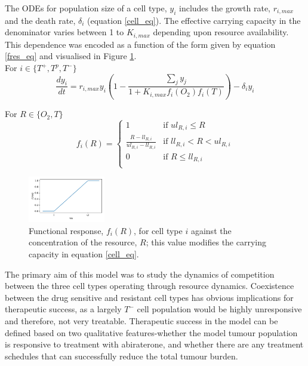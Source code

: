 \documentclass[12pt,onecolumn,twoside]{article}
\begin{document}
	The ODEs for population size of a cell type, $y_i$ includes the growth rate, $r_{i,max}$ and the death rate, $\delta_i$ (equation \ref{cell_eq}). The effective carrying capacity in the denominator varies between 1 to $K_{i,max}$ depending upon resource availability. This dependence was encoded as a function of the form given by equation \ref{fres_eq} and visualised in Figure \ref{fig_fres}.\\
	For $i \in \{T^+,T^p,T^-\}$
	\begin{equation}
	  \frac{dy_i}{dt} = r_{i,max} y_i (1 - \frac{\sum_j y_j}{1 + K_{i,max} f_i(O_2) f_i(T)} )- \delta_i y_i
	  \label{cell_eq}
	\end{equation}

	For $R \in \{O_2,T\}$
	\begin{equation}
	  f_i(R) = \begin{cases}
	  1 &\text{if } ul_{R,i} \leq R \\
	  \frac{R-ll_{R,i}}{ul_{R,i}-ll_{R,i}} &\text{if } ll_{R,i} < R < ul_{R,i} \\
	  0 &\text{if } R \leq ll_{R,i} \\
	  \end{cases}
	  \label{fres_eq}
	\end{equation}

	\begin{figure}
		\centering
		\includegraphics[width=0.3\textwidth]{f_res}
	\caption{\small Functional response, $f_i(R)$, for cell type $i$ against the concentration of the resource, $R$; this value modifies the carrying capacity in equation \ref{cell_eq}.}
	\label{fig_fres}
	\end{figure}

	The primary aim of this model was to study the dynamics of competition between the three cell types operating through resource dynamics. Coexistence between the drug sensitive and resistant cell types has obvious implications for therapeutic success, as a largely $T^-$ cell population would be highly unresponsive and therefore, not very treatable. Therapeutic success in the model can be defined based on two qualitative features-whether the model tumour population is responsive to treatment with abiraterone, and whether there are any treatment schedules that can successfully reduce the total tumour burden.
\end{document}
